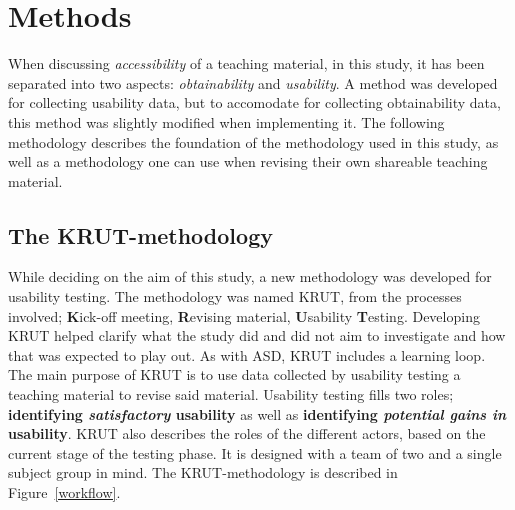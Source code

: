 \chapter{Methods}
When discussing \textit{accessibility} of a teaching material, in this study, it has been separated into two aspects: \textit{obtainability} and \textit{usability}. A method was developed for collecting usability data, but to accomodate for collecting obtainability data, this method was slightly modified when implementing it.
%
%
The following methodology describes the foundation of the methodology used in this study, as well as a methodology one can use when revising their own shareable teaching material.

\section{The KRUT-methodology}
While deciding on the aim of this study, a new methodology was developed for usability testing. The methodology was named KRUT, from the processes involved; \textbf{K}ick-off meeting, \textbf{R}evising material, \textbf{U}sability \textbf{T}esting. Developing KRUT helped clarify what the study did and did not aim to investigate and how that was expected to play out. As with ASD, KRUT includes a learning loop. The main purpose of KRUT is to use data collected by usability testing a teaching material to revise said material. Usability testing fills two roles; \textbf{identifying \textit{satisfactory} usability} as well as \textbf{identifying \textit{potential gains in} usability}. KRUT also describes the roles of the different actors, based on the current stage of the testing phase. It is designed with a team of two and a single subject group in mind. The KRUT-methodology is described in Figure~\ref{workflow}.


